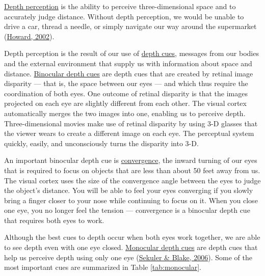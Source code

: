 \documentclass[
]{krantz}
\begin{document}
\protect\hyperlink{depth-perception}{Depth perception} is the ability to perceive three-dimensional space and to accurately judge distance. Without depth perception, we would be unable to drive a car, thread a needle, or simply navigate our way around the supermarket (\protect\hyperlink{ref-Howard2001}{Howard, 2002}).

Depth perception is the result of our use of \protect\hyperlink{depth-cues}{depth cues}, messages from our bodies and the external environment that supply us with information about space and distance. \protect\hyperlink{binocular-depth-cues}{Binocular depth cues} are depth cues that are created by retinal image disparity --- that is, the space between our eyes --- and which thus require the coordination of both eyes. One outcome of retinal disparity is that the images projected on each eye are slightly different from each other. The visual cortex automatically merges the two images into one, enabling us to perceive depth. Three-dimensional movies make use of retinal disparity by using 3-D glasses that the viewer wears to create a different image on each eye. The perceptual system quickly, easily, and unconsciously turns the disparity into 3-D.

An important binocular depth cue is \protect\hyperlink{convergence}{convergence}, the inward turning of our eyes that is required to focus on objects that are less than about 50 feet away from us. The visual cortex uses the size of the convergence angle between the eyes to judge the object's distance. You will be able to feel your eyes converging if you slowly bring a finger closer to your nose while continuing to focus on it. When you close one eye, you no longer feel the tension --- convergence is a binocular depth cue that requires both eyes to work.

Although the best cues to depth occur when both eyes work together, we are able to see depth even with one eye closed. \protect\hyperlink{monocular-depth-cues}{Monocular depth cues} are depth cues that help us perceive depth using only one eye (\protect\hyperlink{ref-Sekuler2006}{Sekuler \& Blake, 2006}). Some of the most important cues are summarized in Table \ref{tab:monocular}.
\end{document}

